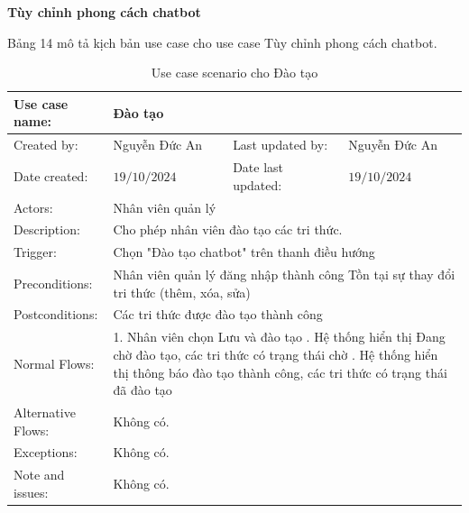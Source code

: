 \textbf{Tùy chỉnh phong cách chatbot}

Bảng 14 mô tả kịch bản use case cho use case Tùy chỉnh phong cách chatbot.

\begin{table}[H]
	\centering
	\begin{tabular}{|l|l|l|l|} 
		\hline Use case name: & \multicolumn{3}{|l|}{Đào tạo} \\ 
		\hline Created by: & Nguyễn Đức An & Last updated by: & Nguyễn Đức An \\ 
		\hline Date created: & $19 / 10 / 2024$ & Date last updated: & $19 / 10 / 2024$\\ 
		\hline Actors: & \multicolumn{3}{|l|}{ Nhân viên quản lý } \\ 
		\hline Description: & \multicolumn{3}{|p{12cm}|}{ Cho phép nhân viên đào tạo các tri thức. } \\ 
		\hline Trigger: & \multicolumn{3}{|p{12cm}|}{ Chọn "Đào tạo chatbot" trên thanh điều hướng } \\ 
		\hline Preconditions: & \multicolumn{3}{|p{12cm}|}{ 
			Nhân viên quản lý đăng nhập thành công \newline
            Tồn tại sự thay đổi tri thức (thêm, xóa, sửa)
		} \\ 
		\hline Postconditions: & \multicolumn{3}{|p{12cm}|}{ 
			Các tri thức được đào tạo thành công
		} \\ 
		\hline Normal Flows: & \multicolumn{3}{|p{12cm}|}{ 
			1. Nhân viên chọn Lưu và đào tạo \newline 
			2. Hệ thống hiển thị Đang chờ đào tạo, các tri thức có trạng thái chờ \newline
            3. Hệ thống hiển thị thông báo đào tạo thành công, các tri thức có trạng thái đã đào tạo
		} \\ 
		\hline Alternative Flows: & \multicolumn{3}{|p{12cm}|}{ Không có. } \\ 
		\hline Exceptions: & \multicolumn{3}{|p{12cm}|}{ Không có. } \\ 
		\hline Note and issues: & \multicolumn{3}{|p{12cm}|}{ Không có. } \\ 
		\hline
	\end{tabular}
	\caption{Use case scenario cho Đào tạo}
\end{table}



